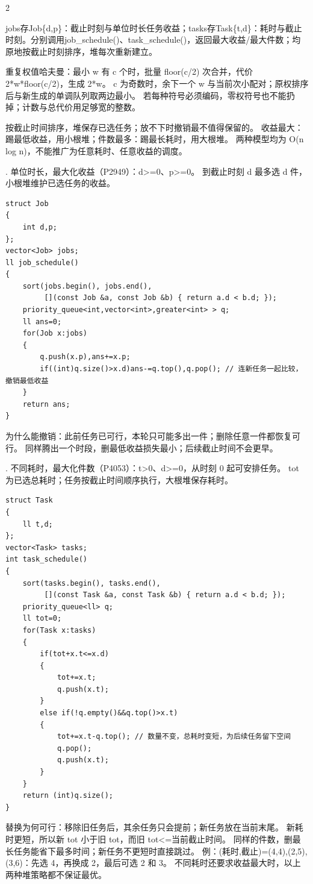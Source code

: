 \documentclass[UTF8,fontset=fandol,a4paper,twoside]{ctexart}
\newcommand{\note}[1]{{\fontsize{10}{12}\selectfont #1\par}}
\begin{document}
\begin{multicols}{2}
\note{jobs存Job\{d,\allowbreak{}p\}：截止时刻与单位时长任务收益；tasks存Task\{t,\allowbreak{}d\}：耗时与截止时刻。分别调用job\_schedule(\allowbreak{})\allowbreak{}、task\_schedule(\allowbreak{})\allowbreak{}，返回最大收益/\allowbreak{}最大件数；均原地按截止时刻排序，堆每次重新建立。}
\note{重复权值哈夫曼：最小 w 有 c 个时，批量 floor(\allowbreak{}c/\allowbreak{}2)\allowbreak{} 次合并，代价 2*w*floor(\allowbreak{}c/\allowbreak{}2)\allowbreak{}，生成 2*w。 c 为奇数时，余下一个 w 与当前次小配对；原权排序后与新生成的单调队列取两边最小。 若每种符号必须编码，零权符号也不能扔掉；计数与总代价用足够宽的整数。}
\note{按截止时间排序，堆保存已选任务；放不下时撤销最不值得保留的。 收益最大：踢最低收益，用小根堆；件数最多：踢最长耗时，用大根堆。 两种模型均为 O(\allowbreak{}n log n)\allowbreak{}，不能推广为任意耗时、任意收益的调度。}
\note{1.\allowbreak{} 单位时长，最大化收益（P2949）：d>\allowbreak{}=\allowbreak{}0、p>\allowbreak{}=\allowbreak{}0。 到截止时刻 d 最多选 d 件，小根堆维护已选任务的收益。}
\begin{lstlisting}
struct Job
{
    int d,p;
};
vector<Job> jobs;
ll job_schedule()
{
    sort(jobs.begin(), jobs.end(),
         [](const Job &a, const Job &b) { return a.d < b.d; });
    priority_queue<int,vector<int>,greater<int> > q;
    ll ans=0;
    for(Job x:jobs)
    {
        q.push(x.p),ans+=x.p;
        if((int)q.size()>x.d)ans-=q.top(),q.pop(); // 连新任务一起比较，撤销最低收益
    }
    return ans;
}
\end{lstlisting}
\note{为什么能撤销：此前任务已可行，本轮只可能多出一件；删除任意一件都恢复可行。 同样腾出一个时段，删最低收益损失最小；后续截止时间不会更早。}
\note{2.\allowbreak{} 不同耗时，最大化件数（P4053）：t>\allowbreak{}0、d>\allowbreak{}=\allowbreak{}0，从时刻 0 起可安排任务。 tot 为已选总耗时；任务按截止时间顺序执行，大根堆保存耗时。}
\begin{lstlisting}
struct Task
{
    ll t,d;
};
vector<Task> tasks;
int task_schedule()
{
    sort(tasks.begin(), tasks.end(),
         [](const Task &a, const Task &b) { return a.d < b.d; });
    priority_queue<ll> q;
    ll tot=0;
    for(Task x:tasks)
    {
        if(tot+x.t<=x.d)
        {
            tot+=x.t;
            q.push(x.t);
        }
        else if(!q.empty()&&q.top()>x.t)
        {
            tot+=x.t-q.top(); // 数量不变，总耗时变短，为后续任务留下空间
            q.pop();
            q.push(x.t);
        }
    }
    return (int)q.size();
}
\end{lstlisting}
\note{替换为何可行：移除旧任务后，其余任务只会提前；新任务放在当前末尾。 新耗时更短，所以新 tot 小于旧 tot，而旧 tot<\allowbreak{}=\allowbreak{}当前截止时间。 同样的件数，删最长任务能省下最多时间；新任务不更短时直接跳过。 例：(\allowbreak{}耗时,\allowbreak{}截止)\allowbreak{}=\allowbreak{}(\allowbreak{}4,\allowbreak{}4)\allowbreak{},\allowbreak{}(\allowbreak{}2,\allowbreak{}5)\allowbreak{},\allowbreak{}(\allowbreak{}3,\allowbreak{}6)\allowbreak{}：先选 4，再换成 2，最后可选 2 和 3。 不同耗时还要求收益最大时，以上两种堆策略都不保证最优。}

\end{multicols}
\end{document}
